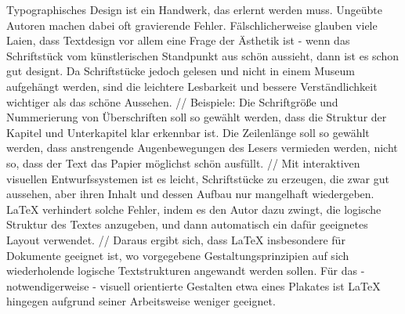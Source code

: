 Typographisches Design ist ein Handwerk, das erlernt werden muss.
Ungeübte Autoren machen dabei oft gravierende Fehler.
Fälschlicherweise glauben viele Laien, dass Textdesign
vor allem eine Frage der Ästhetik ist - wenn das
Schriftstück vom künstlerischen Standpunkt aus schön
aussieht, dann ist es schon gut designt.
Da Schriftstücke jedoch gelesen und nicht in einem Museum
aufgehängt werden, sind die leichtere Lesbarkeit und bessere
Verständlichkeit wichtiger als das schöne Aussehen. //
Beispiele:
Die Schriftgröße und Nummerierung von Überschriften soll so
gewählt werden, dass die Struktur der Kapitel und Unterkapitel
klar erkennbar ist.
Die Zeilenlänge soll so gewählt werden, dass anstrengende
Augenbewegungen des Lesers vermieden werden, nicht so, dass der
Text das Papier möglichst schön ausfüllt. //
Mit interaktiven visuellen Entwurfssystemen ist es leicht,
Schriftstücke zu erzeugen, die zwar gut aussehen,
aber ihren Inhalt und dessen Aufbau nur mangelhaft wiedergeben.
\LaTeX{} verhindert solche
Fehler, indem es den Autor dazu zwingt, die logische
Struktur des Textes anzugeben, und dann automatisch ein dafür
geeignetes Layout verwendet. //
Daraus ergibt sich, dass \LaTeX{} insbesondere für  Dokumente geeignet
ist, wo vorgegebene Gestaltungsprinzipien auf sich wiederholende
logische Textstrukturen angewandt werden sollen.
Für das - notwendigerweise - visuell orientierte Gestalten
etwa eines Plakates ist \LaTeX{} hingegen
aufgrund seiner Arbeitsweise weniger geeignet.

